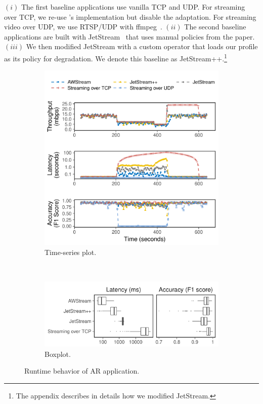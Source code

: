  $(i)$ The first baseline applications use vanilla TCP and
UDP. For streaming over TCP, we re-use \sysname{}'s implementation but disable
the adaptation. For streaming video over UDP, we use RTSP/UDP with
ffmpeg~\cite{bellard2012ffmpeg}. $(ii)$ The second baseline applications are
built with JetStream~\cite{rabkin2014aggregation} that uses manual policies from
the paper. $(iii)$ We then modified JetStream with a custom operator that loads
our profile as its policy for degradation. We denote this baseline as
JetStream++.\footnote{The appendix describes in details how we modified
  JetStream.}

\begin{figure}
  \begin{subfigure}[t]{\columnwidth}
    \centering
    \includegraphics[width=\columnwidth]{figures/runtime_darknet-timeseries.pdf}
    \caption{Time-series plot.}
    \label{fig:ar-runtime-timeseries}
  \end{subfigure}
  \vspace{1em}
  \\
  \begin{subfigure}[t]{\columnwidth}
    \centering
    \includegraphics[width=\columnwidth]{figures/runtime_darknet-boxplot.pdf}
    \caption{Boxplot.}
    \label{fig:ar-runtime-boxplot}
  \end{subfigure}
  \caption{Runtime behavior of AR application.}
  \label{fig:ar-runtime}
\end{figure}

